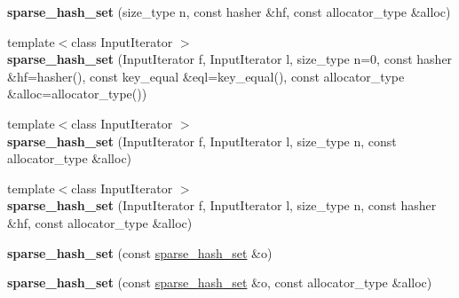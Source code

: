 \begin{DoxyCompactItemize}
\item 
{\bfseries sparse\+\_\+hash\+\_\+set} (size\+\_\+type n, const hasher \&hf, const allocator\+\_\+type \&alloc)\hypertarget{classspp___1_1sparse__hash__set_a9d26c7025ff5d89433154bb5638e7f47}{}\label{classspp___1_1sparse__hash__set_a9d26c7025ff5d89433154bb5638e7f47}

\item 
{\footnotesize template$<$class Input\+Iterator $>$ }\\{\bfseries sparse\+\_\+hash\+\_\+set} (Input\+Iterator f, Input\+Iterator l, size\+\_\+type n=0, const hasher \&hf=hasher(), const key\+\_\+equal \&eql=key\+\_\+equal(), const allocator\+\_\+type \&alloc=allocator\+\_\+type())\hypertarget{classspp___1_1sparse__hash__set_a10688666a23ab35c22aabdb608611d45}{}\label{classspp___1_1sparse__hash__set_a10688666a23ab35c22aabdb608611d45}

\item 
{\footnotesize template$<$class Input\+Iterator $>$ }\\{\bfseries sparse\+\_\+hash\+\_\+set} (Input\+Iterator f, Input\+Iterator l, size\+\_\+type n, const allocator\+\_\+type \&alloc)\hypertarget{classspp___1_1sparse__hash__set_a28d8c7f976cfb9b9dac1b5a64cc75aea}{}\label{classspp___1_1sparse__hash__set_a28d8c7f976cfb9b9dac1b5a64cc75aea}

\item 
{\footnotesize template$<$class Input\+Iterator $>$ }\\{\bfseries sparse\+\_\+hash\+\_\+set} (Input\+Iterator f, Input\+Iterator l, size\+\_\+type n, const hasher \&hf, const allocator\+\_\+type \&alloc)\hypertarget{classspp___1_1sparse__hash__set_a3529b89048f1414d37399ec109cd4e0b}{}\label{classspp___1_1sparse__hash__set_a3529b89048f1414d37399ec109cd4e0b}

\item 
{\bfseries sparse\+\_\+hash\+\_\+set} (const \hyperlink{classspp___1_1sparse__hash__set}{sparse\+\_\+hash\+\_\+set} \&o)\hypertarget{classspp___1_1sparse__hash__set_a7fc41747ecd3d5440c50741f81994e84}{}\label{classspp___1_1sparse__hash__set_a7fc41747ecd3d5440c50741f81994e84}

\item 
{\bfseries sparse\+\_\+hash\+\_\+set} (const \hyperlink{classspp___1_1sparse__hash__set}{sparse\+\_\+hash\+\_\+set} \&o, const allocator\+\_\+type \&alloc)\hypertarget{classspp___1_1sparse__hash__set_a68c159225d4aa6d3c20897c9956c9b6f}{}\label{classspp___1_1sparse__hash__set_a68c159225d4aa6d3c20897c9956c9b6f}


\end{DoxyCompactItemize}
